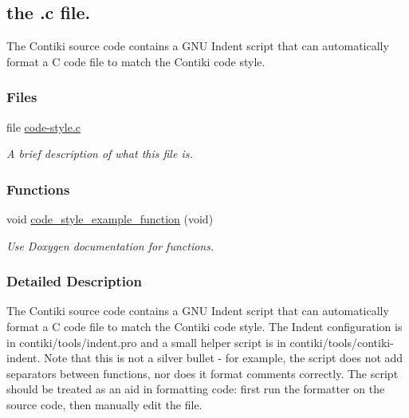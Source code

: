 \hypertarget{a00063}{\subsection{the .c file.}
\label{a00063}
}


\-The \-Contiki source code contains a \-G\-N\-U \-Indent script that can automatically format a \-C code file to match the \-Contiki code style.  


\subsubsection*{\-Files}
\begin{DoxyCompactItemize}
\item 
file \hyperlink{a00020}{code-\/style.\-c}
\begin{DoxyCompactList}\small\item\em \-A brief description of what this file is. \end{DoxyCompactList}\end{DoxyCompactItemize}
\subsubsection*{\-Functions}
\begin{DoxyCompactItemize}
\item 
void \hyperlink{a00063_gaf4091e5d6984567763b6f5b792d2407f}{code\-\_\-style\-\_\-example\-\_\-function} (void)
\begin{DoxyCompactList}\small\item\em \-Use \-Doxygen documentation for functions. \end{DoxyCompactList}\end{DoxyCompactItemize}


\subsubsection{\-Detailed \-Description}
\-The \-Contiki source code contains a \-G\-N\-U \-Indent script that can automatically format a \-C code file to match the \-Contiki code style. \-The \-Indent configuration is in contiki/tools/indent.\-pro and a small helper script is in contiki/tools/contiki-\/indent. \-Note that this is not a silver bullet -\/ for example, the script does not add separators between functions, nor does it format comments correctly. \-The script should be treated as an aid in formatting code\-: first run the formatter on the source code, then manually edit the file. 

